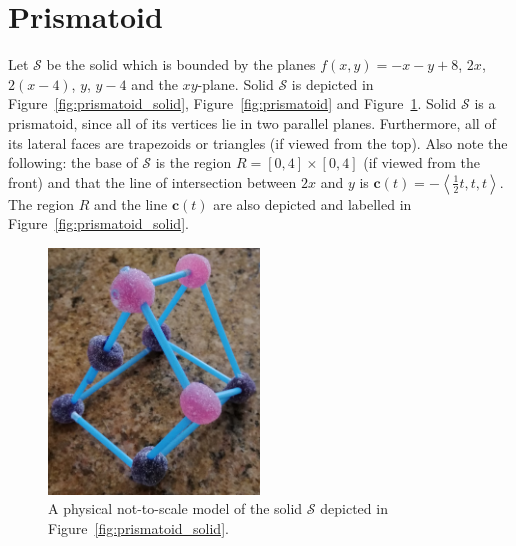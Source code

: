 \documentclass{article}
\theoremstyle{theorem}
\theoremstyle{definition}
\begin{document}
\section{Prismatoid}
Let $\mathcal{S}$ be the solid which is bounded by the planes $f(x,y)=-x-y+8$, $2x$, $2(x-4)$, $y$, $y-4$ and the $xy$-plane. Solid $\mathcal{S}$ is depicted 
in Figure~\ref{fig:prismatoid_solid}, Figure~\ref{fig:prismatoid} and Figure~\ref{fig:prismatoid_real}. Solid $\mathcal{S}$ is a prismatoid, since all of its 
vertices lie in two parallel planes. Furthermore, all of its lateral faces are trapezoids or triangles (if viewed from the top). Also note the following: the base of $\mathcal{S}$ is the region 
 $R = [0,4]\times [0,4]$ (if viewed from the front) and that the line of intersection between $2x$ and $y$ is $\mathbf{c}(t) = -\left<\frac{1}{2}t,t,t\right>$. The region $R$ and the line $\mathbf{c}(t)$ are
also depicted and labelled in Figure~\ref{fig:prismatoid_solid}.\\

\begin{figure}[htb]
\centering
\includegraphics[width=0.5\textwidth]{prismatoid_real.jpg}
\caption{A physical not-to-scale model of the solid $\mathcal{S}$ depicted in Figure~\ref{fig:prismatoid_solid}.}
\label{fig:prismatoid_real}
\end{figure}
\end{document}
